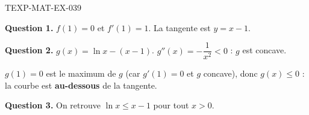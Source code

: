 \begin{corrige}{TEXP-MAT-EX-039}

\textbf{Question 1.} $f(1)=0$ et $f'(1)=1$. La tangente est $y = x - 1$.


\textbf{Question 2.} $g(x) = \ln x - (x-1)$. $g''(x) = -\dfrac{1}{x^2} < 0$ : $g$ est concave.

$g(1) = 0$ est le maximum de $g$ (car $g'(1) = 0$ et $g$ concave), donc $g(x) \leq 0$ : la courbe est \textbf{au-dessous} de la tangente.

\textbf{Question 3.} On retrouve $\ln x \leq x - 1$ pour tout $x > 0$.

\end{corrige}
